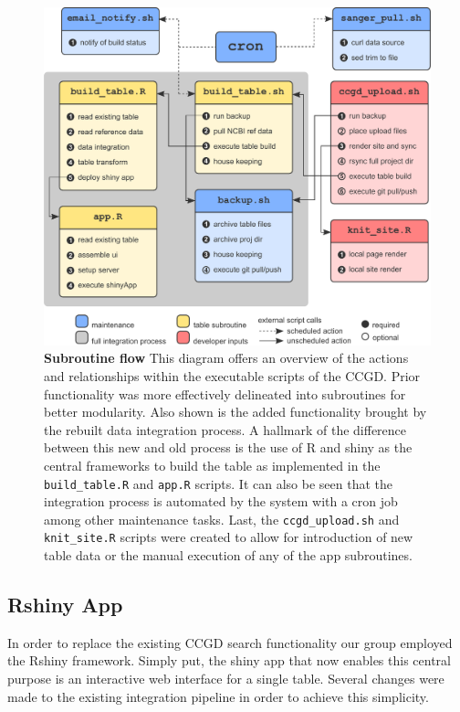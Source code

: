 \documentclass[10pt]{report}
\begin{document}
\begin{figure}[H]
    \centering
    \includegraphics[width=\textwidth]{fig/subroutine_flow.pdf}
    \caption[Subroutine flow]{\textbf{Subroutine flow} This diagram offers an overview of the actions and relationships within the executable scripts of the CCGD\@. Prior functionality was more effectively delineated into subroutines for better modularity. Also shown is the added functionality brought by the rebuilt data integration process. A hallmark of the difference between this new and old process is the use of R and shiny as the central frameworks to build the table as implemented in the \texttt{build\_table.R} and \texttt{app.R} scripts. It can also be seen that the integration process is automated by the system with a cron job among other maintenance tasks. Last, the \texttt{ccgd\_upload.sh} and \texttt{knit\_site.R} scripts were created to allow for introduction of new table data or the manual execution of any of the app subroutines.}\label{fig:subroutine}
\end{figure}

\subsection{Rshiny App}
In order to replace the existing CCGD search functionality our group employed the Rshiny framework. Simply put, the shiny app that now enables this central purpose is an interactive web interface for a single table. Several changes were made to the existing integration pipeline in order to achieve this simplicity.
\end{document}
